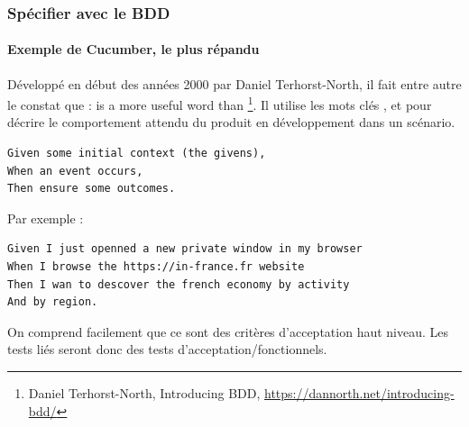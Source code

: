 \documentclass{beamer}
\begin{document}
    \begin{frame}[fragile]
        \frametitle{Spécifier avec le BDD}
        \framesubtitle{Exemple de Cucumber, le plus répandu}
        \transdissolve
        Développé en début des années 2000 par Daniel Terhorst-North, il fait entre autre le constat que :  is a more useful word than \footnote{Daniel Terhorst-North, Introducing BDD, \url{https://dannorth.net/introducing-bdd/}}.
        \bigbreak
        Il utilise les mots clés ,  et  pour décrire le comportement attendu du produit en développement dans un scénario.
        \begin{lstlisting}
Given some initial context (the givens),
When an event occurs,
Then ensure some outcomes.
        \end{lstlisting}

        Par exemple :
        \begin{lstlisting}
Given I just openned a new private window in my browser
When I browse the https://in-france.fr website
Then I wan to descover the french economy by activity
And by region.
        \end{lstlisting}

        On comprend facilement que ce sont des critères d'acceptation haut niveau.
        Les tests liés seront donc des tests d'acceptation/fonctionnels.
    \end{frame}
\end{document}

